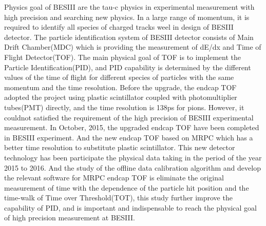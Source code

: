 \begin{englishabstract}
Physics goal of BESIII are the tau-c physics in experimental measurement with high precision and searching new physics.
In a large range of momentum, it is required to identify all species of charged tracks weel in design of BESIII detector.
The particle identification system of BESIII detector consists of Main Drift Chamber(MDC) which is providing the measurement of dE/dx and Time of Flight Detector(TOF).
The main physical goal of TOF is to implement the Particle Identification(PID), and PID capability is determined by the different values of the time of flight for different species of particles with the same momentum and the time resolution.
Before the upgrade, the endcap TOF adopted the project using plastic scintillator coupled with photomultiplier tubes(PMT) directly, and the time resolution is 138ps for pions. However, it couldnot satisfied the requirement of the high precision of BESIII experimental measurement. In October, 2015, the upgraded endcap TOF have been completed in BESIII experiment. And the new endcap TOF based on MRPC which has a better time resolution to substitute plastic scintillator. This new detector technology has been participate the physical data taking in the period of the year 2015 to 2016.
And the study of the offline data calibration algorithm and develop the relevant software for MRPC endcap TOF is eliminate the original measurement of time with the dependence of the particle hit position and the time-walk of Time over Threshold(TOT), this study further improve the capability of PID, and is important and indispensable to reach the physical goal of high precision measurement at BESIII. 


\end{englishabstract}
